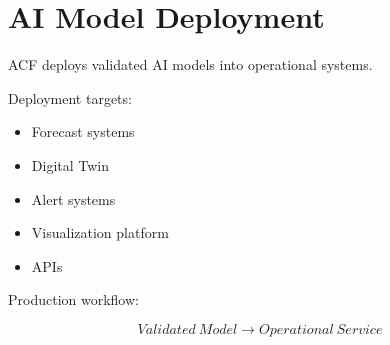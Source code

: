 \section{AI Model Deployment}


ACF deploys validated AI models into operational systems.



Deployment targets:


\begin{itemize}

\item Forecast systems

\item Digital Twin

\item Alert systems

\item Visualization platform

\item APIs

\end{itemize}



Production workflow:


\[
Validated\ Model
\rightarrow
Operational\ Service
\]
